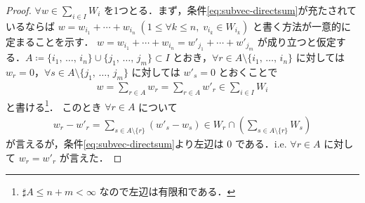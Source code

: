 \documentclass[rep_main]{subfiles}
\begin{document}

\begin{proof}
    $\forall w \in \sum_{i \in I} W_i$ を1つとる．まず，条件\eqref{eq:subvec-directsum}が充たされているならば $w = w_{i_1} + \cdots + w_{i_n}\; (1 \le \forall k \le n,\; v_{i_k} \in W_{i_k})$ と書く方法が一意的に定まることを示す．
    $w = w_{i_1} + \cdots + w_{i_n} = w'_{j_1} + \cdots + w'_{j_m}$ が成り立つと仮定する．$A \coloneqq \{i_1,\, \dots,\, i_n\} \cup \{j_1,\, \dots,\, j_m\} \subset I$ とおき，$\forall r \in A \setminus \{i_1,\, \dots,\, i_n\}$ に対しては $w_{r} = 0$，$\forall s \in A \setminus \{j_1,\, \dots,\, j_m\}$ に対しては $w'_s = 0$ とおくことで
    \begin{align}
        w = \sum_{r \in A} w_r = \sum_{r \in A} w'_r \in \sum_{i \in I} W_i
    \end{align}
    と書ける\footnote{$\sharp A \le n + m < \infty$ なので左辺は有限和である．}．
    このとき $\forall r \in A$ について
    \begin{align}
        w_r - w'_r = \sum_{s \in A \setminus \{r\}} (w'_s - w_s) \in W_r \cap \left(\sum_{s \in A \setminus \{r\}} W_s\right)
    \end{align}
    が言えるが，条件\eqref{eq:subvec-directsum}より左辺は $0$ である．i.e. $\forall r \in A$ に対して $w_r = w'_r$ が言えた．


\end{proof}
\end{document}
